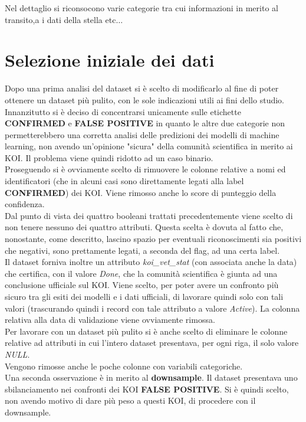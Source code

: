Nel dettaglio si riconsocono varie categorie tra cui informazioni in merito al 
transito,a i dati della stella etc$\ldots$

\section{Selezione iniziale dei dati}
Dopo una prima analisi del dataset si è scelto di modificarlo al fine di poter 
ottenere un dataset più pulito, con le sole indicazioni utili ai fini dello 
studio.\\
Innanzitutto si è deciso di concentrarsi unicamente sulle etichette 
\textbf{CONFIRMED} e \textbf{FALSE POSITIVE} in quanto le altre due categorie
non permetterebbero una corretta analisi delle predizioni dei modelli di machine
learning, non avendo un'opinione "sicura" della comunità scientifica in merito 
ai KOI. Il problema viene quindi ridotto ad un caso binario.\\
Proseguendo si è ovviamente scelto di rimuovere le colonne relative a nomi ed
identificatori (che in alcuni casi sono direttamente legati alla label 
\textbf{CONFIRMED}) dei KOI. Viene rimosso anche lo score di punteggio della 
confidenza. \\
Dal punto di vista dei quattro booleani trattati precedentemente viene scelto
di non tenere nessuno dei quattro attributi. Questa scelta è dovuta al fatto 
che, nonostante, come descritto, lascino spazio per eventuali riconoscimenti 
sia positivi che negativi, sono prettamente legati, a seconda del flag, ad una
certa label. \\
Il dataset forniva inoltre un attributo \textit{koi\_vet\_stat} (con associata 
anche la data) che certifica, con il valore \textit{Done}, che la comunità 
scientifica è giunta ad una conclusione ufficiale sul KOI. Viene scelto, per
poter avere un confronto più sicuro tra gli esiti dei modelli e i dati 
ufficiali, di lavorare quindi solo con tali valori (trascurando quindi i 
record con tale attributo a valore \textit{Active}). La colonna relativa alla 
data di validazione viene ovviamente rimossa.\\
Per lavorare con un dataset più pulito si è anche scelto di eliminare le colonne
relative ad attributi in cui l'intero dataset presentava, per ogni riga, il solo
valore \textit{NULL}.\\
Vengono rimosse anche le poche colonne con variabili categoriche.\\

Una seconda osservazione è in merito al \textbf{downsample}. Il dataset 
presentava uno sbilanciamento nei confronti dei KOI \textbf{FALSE POSITIVE}. Si 
è quindi scelto, non avendo motivo di dare più peso a questi KOI, di procedere 
con il downsample.


